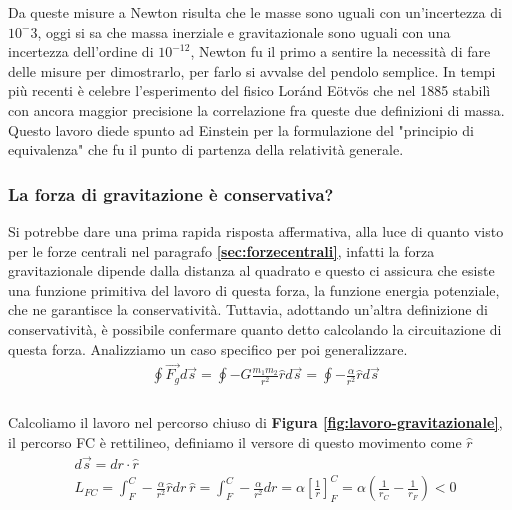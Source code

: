  Da queste misure a Newton risulta che le masse sono uguali con un'incertezza di $10^-3$, oggi si sa che massa inerziale e gravitazionale sono uguali con una incertezza dell'ordine di $10^{-12}$, Newton fu il primo a sentire la necessità di fare delle misure per dimostrarlo, per farlo si avvalse del pendolo semplice. In tempi più recenti è celebre l'esperimento del fisico Loránd Eötvös che nel 1885 stabilì con ancora maggior precisione la correlazione fra queste due definizioni di massa. Questo lavoro diede spunto ad Einstein per la formulazione del "principio di equivalenza" che fu il punto di partenza della relatività generale.
 \subsubsection{La forza di gravitazione è conservativa?}
Si potrebbe dare una prima rapida risposta affermativa, alla luce di quanto visto per le forze centrali nel paragrafo \textbf{\ref{sec:forzecentrali}}, infatti la forza gravitazionale dipende dalla distanza al quadrato e questo ci assicura che esiste una funzione primitiva del lavoro di questa forza, la funzione energia potenziale, che ne garantisce la conservatività. Tuttavia, adottando un'altra definizione di conservatività, è possibile confermare quanto detto calcolando la circuitazione di questa forza. Analizziamo un caso specifico per poi generalizzare.
\begin{align*}
	&\oint \vec{F_g}d\vec{s}=\oint -G\frac{m_1 m_2}{r^2}\hat{r}d\vec{s} = \oint -\frac{\alpha}{r^2}\hat{r}d\vec{s}\\
\end{align*}\\
Calcoliamo il lavoro nel percorso chiuso di \textbf{Figura \ref{fig:lavoro-gravitazionale}}, il percorso FC è rettilineo, definiamo il versore di questo movimento come  $\hat{r}$
\begin{align*}
	&d\vec{s} = dr \cdot \hat{r}\\
	&L_{FC} = \int_F^C -\frac{\alpha}{r^2}\hat{r}dr\ \hat{r} = \int_F^C -\frac{\alpha}{r^2} dr = \alpha[\frac{1}{r}]_F^C = \alpha(\frac{1}{r_C}-\frac{1}{r_F}) < 0
\end{align*}
